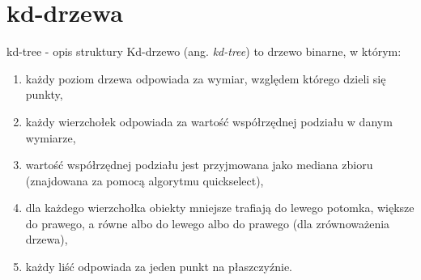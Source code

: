 \documentclass[aspectratio=169,dvipsnames]{beamer}
\begin{document}
\section{kd-drzewa}

\begin{frame}{kd-tree - opis struktury}
    Kd-drzewo (ang. \textit{kd-tree}) to drzewo binarne, w którym:
    \begin{enumerate}
        \item<2-> każdy poziom drzewa odpowiada za wymiar, względem którego dzieli się punkty,
        \item<3-> każdy wierzchołek odpowiada za wartość współrzędnej podziału w danym wymiarze,
        \item<4-> wartość współrzędnej podziału jest przyjmowana jako mediana zbioru (znajdowana za pomocą algorytmu quickselect),
        \item<5-> dla każdego wierzchołka obiekty mniejsze trafiają do lewego potomka, większe do prawego, a równe albo do lewego albo do prawego (dla zrównoważenia drzewa),
        \item<6-> każdy liść odpowiada za jeden punkt na płaszczyźnie.
    \end{enumerate}
\end{frame}
\end{document}
